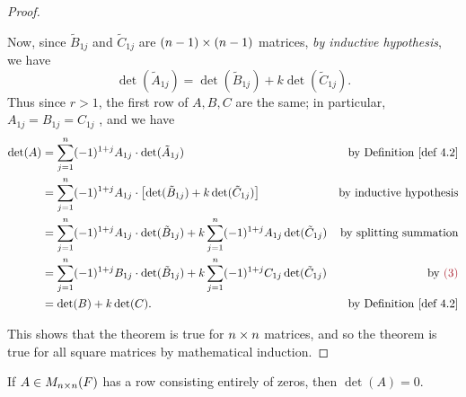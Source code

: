 \begin{proof}
\begin{itemize}
Now, since \(\tilde{B}_{1j}\) and \(\tilde{C}_{1j}\) are \((n - 1) \times (n - 1)\) matrices, \emph{by inductive hypothesis}, we have
\[
    \det(\tilde{A}_{1j}) = \det(\tilde{B}_{1j}) + k \det(\tilde{C}_{1j}).
\]
Thus since \(r > 1\), the first row of \(A, B, C\) are the same; in particular, \(A_{1j} = B_{1j} = C_{1j}\) , and we have
\begin{align*}
    \det(A) & = \sum_{j = 1}^n (-1)^{1 + j} A_{1j} \cdot \det(\tilde{A}_{1j}) & \text{by \DEF{4.2}} \\
            & = \sum_{j = 1}^n (-1)^{1 + j} A_{1j} \cdot \left[ \det(\tilde{B}_{1j}) + k \det(\tilde{C}_{1j}) \right] & \text{by inductive hypothesis} \\
            & = \sum_{j = 1}^n (-1)^{1 + j} A_{1j} \cdot \det(\tilde{B}_{1j}) + k \sum_{j = 1}^n (-1)^{1 + j} A_{1j} \det(\tilde{C}_{1j}) & \text{by splitting summation} \\
            & = \sum_{j = 1}^n (-1)^{1 + j} B_{1j} \cdot \det(\tilde{B}_{1j}) + k \sum_{j = 1}^n (-1)^{1 + j} C_{1j} \det(\tilde{C}_{1j}) & \text{by \MAROON{(3)}} \\
            & = \det(B) + k \det(C). & \text{by \DEF{4.2}}
\end{align*}
\end{itemize}
This shows that the theorem is true for \(n \times n\) matrices, and so the theorem is true for all square matrices by mathematical induction.
\end{proof}

\begin{corollary} \label{corollary 4.3.1}
If \(A \in M_{n \times n}(F)\) has a row consisting entirely of zeros, then \(\det(A) = 0\).
\end{corollary}

